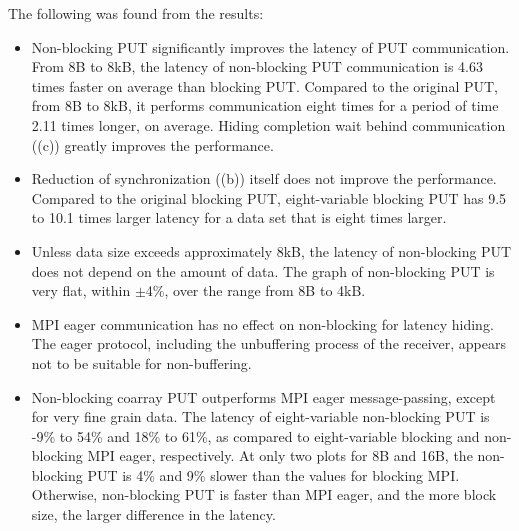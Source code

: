 The following was found from the results:
\begin{itemize}
\item
Non-blocking PUT significantly improves the latency of PUT communication. 
From 8B to 8kB, the latency of non-blocking PUT communication is 4.63 times faster on average than blocking PUT. 
Compared to the original PUT, from 8B to 8kB, it performs communication eight times for a period of time 2.11 times longer, on average.
Hiding completion wait behind communication ((c))
greatly improves the performance.

\item
Reduction of synchronization ((b)) itself does not
improve the performance. Compared to the original blocking PUT, 
eight-variable blocking PUT has 9.5 to 10.1 times larger latency for a data set that is eight times
larger.

\item
Unless data size exceeds approximately 8kB, the latency of non-blocking PUT does not
depend on the amount of data. 
The graph of non-blocking PUT is very flat, within $\pm$4\%, over the range 
from 8B to 4kB.

\item 
MPI eager communication has no effect on non-blocking for latency hiding.
The eager protocol, including the unbuffering process of the receiver, appears not to be suitable for
non-buffering.

\item 
Non-blocking coarray PUT outperforms MPI eager message-passing,
except for very fine grain data.
The latency of eight-variable non-blocking PUT is -9\% to 54\% and 18\% to 61\%, as 
compared to eight-variable blocking and non-blocking MPI eager, respectively.
At only two plots for 8B and 16B, the non-blocking PUT is 4\% and 9\% slower 
than the values for blocking MPI. Otherwise, non-blocking PUT is faster than MPI eager, and
the more block size, the larger difference in the latency.

\end{itemize}


